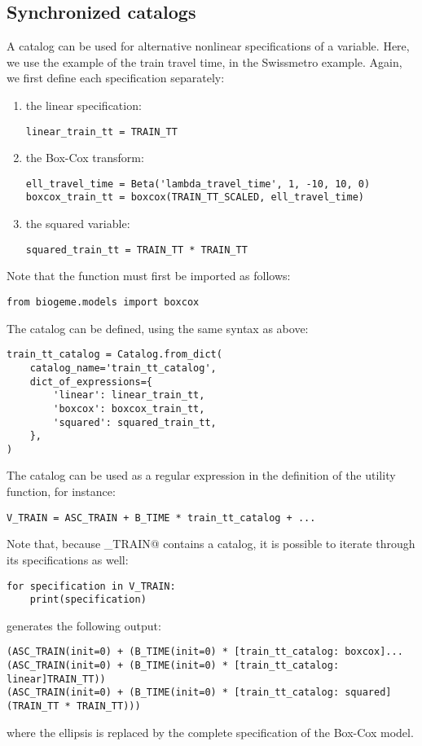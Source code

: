 \documentclass[12pt,a4paper]{article}
\begin{document}
\subsection{Synchronized catalogs}

A catalog can be used for alternative nonlinear specifications of a variable. Here, we use the example of the train travel time, in the Swissmetro example. Again, we first define each specification separately:
\begin{enumerate}
\item the linear specification:
  \begin{lstlisting}
linear_train_tt = TRAIN_TT
  \end{lstlisting}
\item the Box-Cox transform:
\begin{lstlisting}
ell_travel_time = Beta('lambda_travel_time', 1, -10, 10, 0)
boxcox_train_tt = boxcox(TRAIN_TT_SCALED, ell_travel_time)
\end{lstlisting}
\item the squared variable:
  \begin{lstlisting}
squared_train_tt = TRAIN_TT * TRAIN_TT
  \end{lstlisting}
\end{enumerate}
Note that the \lstinline@boxcox@ function must first be imported as follows:
\begin{lstlisting}
from biogeme.models import boxcox
\end{lstlisting}
The catalog can  be defined, using the same syntax as above:
\begin{lstlisting}
train_tt_catalog = Catalog.from_dict(
    catalog_name='train_tt_catalog',
    dict_of_expressions={
        'linear': linear_train_tt,
        'boxcox': boxcox_train_tt,
        'squared': squared_train_tt,
    },
)  
\end{lstlisting}
The catalog can  be used as a regular expression in the definition of the utility function, for instance:
\begin{lstlisting}
V_TRAIN = ASC_TRAIN + B_TIME * train_tt_catalog + ...
\end{lstlisting}
Note that, because \lstinline@V_TRAIN@ contains a catalog, it is possible to iterate through its specifications as well:
\begin{lstlisting}
for specification in V_TRAIN:
    print(specification)
\end{lstlisting}
generates the following output:
\begin{lstlisting}
(ASC_TRAIN(init=0) + (B_TIME(init=0) * [train_tt_catalog: boxcox]...
(ASC_TRAIN(init=0) + (B_TIME(init=0) * [train_tt_catalog: linear]TRAIN_TT))
(ASC_TRAIN(init=0) + (B_TIME(init=0) * [train_tt_catalog: squared](TRAIN_TT * TRAIN_TT)))
\end{lstlisting}
where the ellipsis is replaced by the complete specification of the Box-Cox model.
\end{document}
